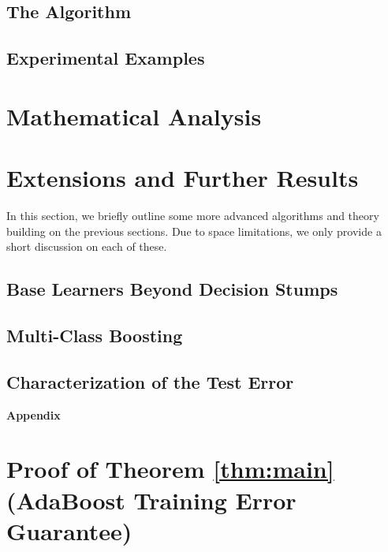 \documentclass[english,12pt]{article}
\begin{document}
	
	\subsection{The Algorithm}
	
	
	\subsection{Experimental Examples}
	
	
	\section{Mathematical Analysis} \label{sec:math}
	
	
	\section{Extensions and Further Results} \label{sec:ext}
	
	In this section, we briefly outline some more advanced algorithms and theory building on the previous sections.  Due to space limitations, we only provide a short discussion on each of these.
	
	\subsection{Base Learners Beyond Decision Stumps} \label{sec:base}
	
	
	\subsection{Multi-Class Boosting} \label{sec:multi}
	
	
	\subsection{Characterization of the Test Error} \label{sec:test_error}
	
	
	
	\newpage
	
	
	
	\newpage
	{\huge \centering \bf Appendix \par}
	
	\appendix
	
	\section{Proof of Theorem \ref{thm:main} (AdaBoost Training Error Guarantee)}
	
	
\end{document}
